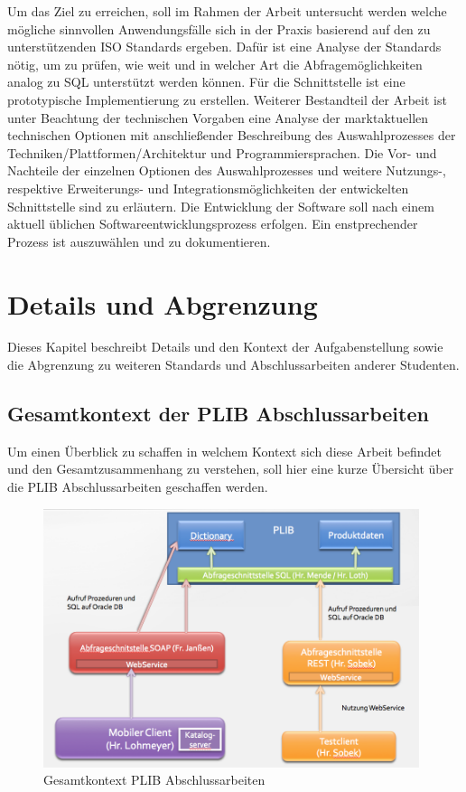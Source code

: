 Um das Ziel zu erreichen, soll im Rahmen der Arbeit untersucht werden welche mögliche sinnvollen Anwendungsfälle sich in der Praxis basierend auf den zu unterstützenden ISO Standards ergeben. Dafür ist eine Analyse der Standards nötig, um zu prüfen, wie weit und in welcher Art die Abfragemöglichkeiten analog zu SQL unterstützt werden können. Für die Schnittstelle ist eine prototypische Implementierung zu erstellen. Weiterer Bestandteil der Arbeit ist unter Beachtung der technischen Vorgaben eine Analyse der marktaktuellen technischen Optionen mit anschließender Beschreibung des Auswahlprozesses der Techniken/Plattformen/Architektur und Programmiersprachen. Die Vor- und Nachteile der einzelnen Optionen des Auswahlprozesses und weitere Nutzungs-, respektive Erweiterungs- und Integrationsmöglichkeiten der entwickelten Schnittstelle sind zu erläutern. 
Die Entwicklung der Software soll nach einem aktuell üblichen Softwareentwicklungsprozess erfolgen. Ein enstprechender Prozess ist auszuwählen und zu dokumentieren. 

\section{Details und Abgrenzung}

Dieses Kapitel beschreibt Details und den Kontext der Aufgabenstellung sowie die Abgrenzung zu weiteren Standards und Abschlussarbeiten anderer Studenten. 

\subsection{Gesamtkontext der PLIB Abschlussarbeiten}

Um einen Überblick zu schaffen in welchem Kontext sich diese Arbeit befindet und den Gesamtzusammenhang zu verstehen, soll hier eine kurze Übersicht über die PLIB Abschlussarbeiten geschaffen werden. 

\begin{figure}[htbp]
	\centering
		\includegraphics[width=0.98\textwidth]{images/gesamtkontext_plib.png}
	\caption{Gesamtkontext PLIB Abschlussarbeiten}
	\label{fig:gesamtkontext_plib}
\end{figure}

